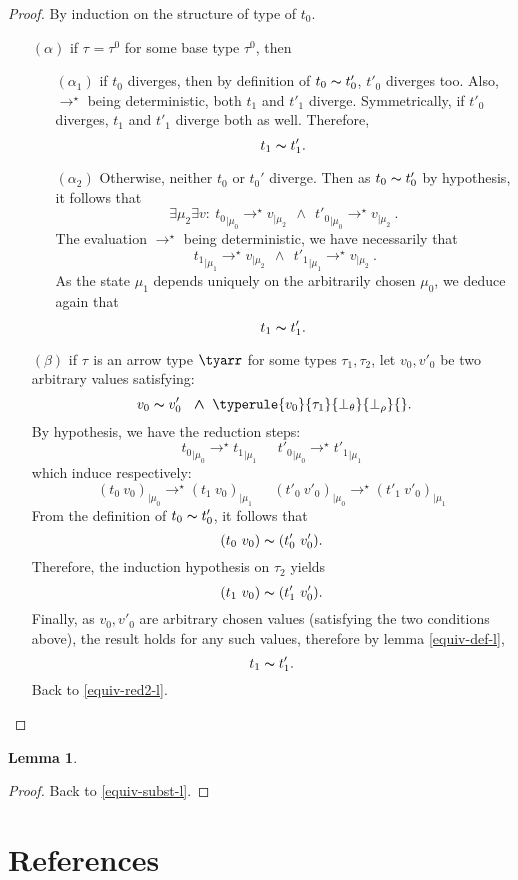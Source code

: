 \documentclass[a4paper,11pt,oneside]{article}
\theoremstyle{plain}
\newtheorem{lemma}[definition]{Lemma}
\newcommand{\tmapp}[2]{(#1 ~ #2)}
\newcommand{\ty}[1][]{\tau_{#1}}
\newcommand{\bwedge}{\boldsymbol{~\wedge~}}
\newcommand{\evalstar}[4]{~#1_{|\mu_#2} \rightarrow^{\star} #3_{|\mu_#4} ~}
\newcommand{\eqv}[1]{#1 \thicksim #1'}
\begin{document}
	\begin{proof}
		By induction on the structure of type of $t_0$. 
		\begin{itemize}
		\item[$(\alpha)$] if $\ty = \ty^0$ for some base type $\ty^0$, then
		
			\begin{itemize}
			\item[$(\alpha_1)$] if $t_0$ diverges, then by definition of 
			$\eqv{t_0}$, $t'_0$ diverges too. Also, $\rightarrow^\star$ being 
			deterministic, both $t_1$ and $t'_1$ diverge. Symmetrically, if 
			$t'_0$ diverges, $t_1$ and $t'_1$ diverge both as well. Therefore,
			$$\eqv{t_1}.$$
						
			\item[$(\alpha_2)$] Otherwise, neither $t_0$ or $t_{0}'$ diverge. Then
				as $\eqv{t_0}$ by hypothesis, it follows that 
					$$ \exists \mu_2 \exists v: 
					\evalstar{{t_0}}{0}{v}{2} \bwedge \evalstar{{t'_0}}{0}{v}{2}.$$
				The evaluation $\rightarrow^\star$ being deterministic, we have 
				necessarily that
					$$\evalstar{{t_1}}{1}{v}{2} \bwedge \evalstar{{t'_1}}{1}{v}{2}.$$
				As the state $\mu_1$ depends uniquely on the arbitrarily chosen 
				$\mu_0$, we deduce again that $$\eqv{t_1}.$$					
			\end{itemize}			
			
		\item[$(\beta)$] if $\ty$ is an arrow type $\tyarr$ for some types 
		$\ty[1], \ty[2]$,	let $v_0, v'_0$ be two arbitrary values satisfying:
		$$~\eqv{v_0}~\bwedge \typerule{v_0}{\ty[1]}{\bot_\theta}{\bot_\rho}{}.$$
		By hypothesis, we have the reduction steps:
		$$\evalstar{{t_0}}{0}{{t_1}}{1}\quad\evalstar{{t'_0}}{0}{{t'_1}}{1}$$						which induce respectively: 
		$$\evalstar{\tmapp{t_0}{v_0}}{0}{\tmapp{t_1}{v_0}}{1} \quad
		\evalstar{\tmapp{t'_0}{v'_0}}{0}{\tmapp{t'_1}{v'_0}}{1}$$	
		From the definition of $\eqv{t_0}$, it follows that
		$${\tmapp{t_0}{v_0}} \thicksim {\tmapp{t'_0}{v'_0}}.$$
		Therefore, the induction hypothesis on $\ty[2]$ yields 
		$${\tmapp{t_1}{v_0}}\thicksim{\tmapp{t'_1}{v'_0}}.$$
		Finally, as $v_0, v'_0$ are arbitrary chosen values (satisfying the
		two conditions above), the result holds for any such values, 
		therefore by lemma \ref{equiv-def-l},
		$$\eqv{t_1}.$$ Back to \ref{equiv-red2-l}.	
		\end{itemize}	
	\end{proof}		

	\begin{lemma}

	\label{equiv-subst-p}
	\end{lemma}

	\begin{proof}
	Back to \ref{equiv-subst-l}.
	\end{proof}
	
\newpage
\section{References} 


\end{document}
